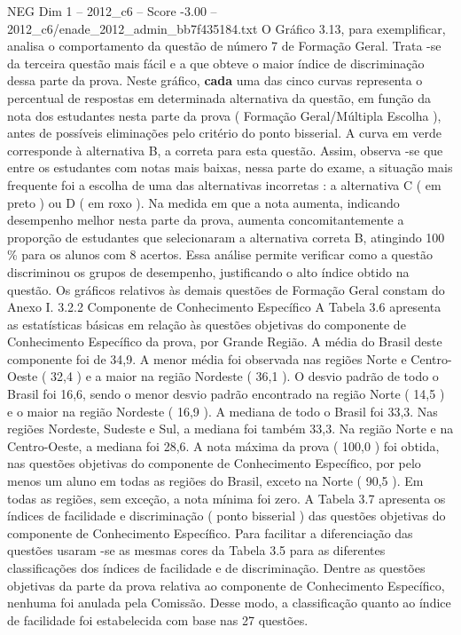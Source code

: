 \begin{textsample}{NEG Dim 1 – 2012\_c6 – Score -3.00 – 2012\_c6/enade\_2012\_admin\_bb7f435184.txt}
O Gráfico 3.13, para exemplificar, analisa o comportamento da questão de número 7 de Formação Geral.
Trata -se da terceira questão mais fácil e a que obteve o maior índice de discriminação dessa parte da prova.
Neste gráfico, \textbf{cada} uma das cinco curvas representa o percentual de respostas em determinada alternativa da questão, em função da nota dos estudantes nesta parte da prova ( Formação Geral/Múltipla Escolha ), antes de possíveis eliminações pelo critério do ponto bisserial.
A curva em verde corresponde à alternativa B, a correta para esta questão.
Assim, observa -se que entre os estudantes com notas mais baixas, nessa parte do exame, a situação mais frequente foi a escolha de uma das alternativas incorretas : a alternativa C ( em preto ) ou D ( em roxo ).
Na medida em que a nota aumenta, indicando desempenho melhor nesta parte da prova, aumenta concomitantemente a proporção de estudantes que selecionaram a alternativa correta B, atingindo 100 \% para os alunos com 8 acertos.
Essa análise permite verificar como a questão discriminou os grupos de desempenho, justificando o alto índice obtido na questão.
Os gráficos relativos às demais questões de Formação Geral constam do Anexo I. 3.2.2 Componente de Conhecimento Específico A Tabela 3.6 apresenta as estatísticas básicas em relação às questões objetivas do componente de Conhecimento Específico da prova, por Grande Região.
A média do Brasil deste componente foi de 34,9.
A menor média foi observada nas regiões Norte e Centro-Oeste ( 32,4 ) e a maior na região Nordeste ( 36,1 ).
O desvio padrão de todo o Brasil foi 16,6, sendo o menor desvio padrão encontrado na região Norte ( 14,5 ) e o maior na região Nordeste ( 16,9 ).
A mediana de todo o Brasil foi 33,3.
Nas regiões Nordeste, Sudeste e Sul, a mediana foi também 33,3.
Na região Norte e na Centro-Oeste, a mediana foi 28,6.
A nota máxima da prova ( 100,0 ) foi obtida, nas questões objetivas do componente de Conhecimento Específico, por pelo menos um aluno em todas as regiões do Brasil, exceto na Norte ( 90,5 ).
Em todas as regiões, sem exceção, a nota mínima foi zero.
A Tabela 3.7 apresenta os índices de facilidade e discriminação ( ponto bisserial ) das questões objetivas do componente de Conhecimento Específico.
Para facilitar a diferenciação das questões usaram -se as mesmas cores da Tabela 3.5 para as diferentes classificações dos índices de facilidade e de discriminação.
Dentre as questões objetivas da parte da prova relativa ao componente de Conhecimento Específico, nenhuma foi anulada pela Comissão.
Desse modo, a classificação quanto ao índice de facilidade foi estabelecida com base nas 27 questões.

\end{textsample}

